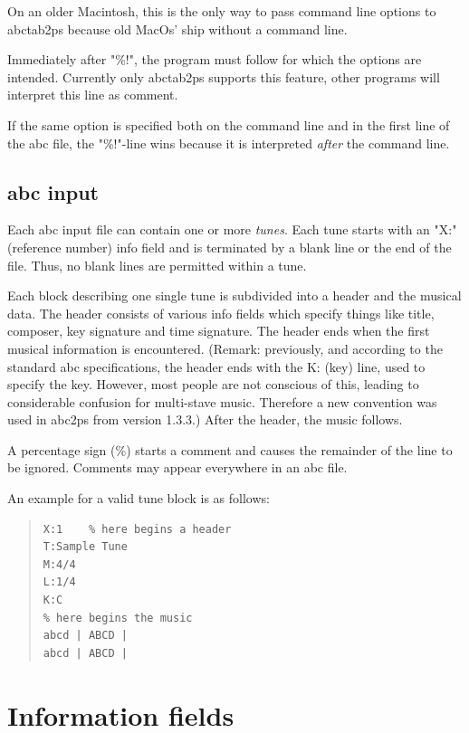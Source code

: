 \documentclass[a4paper]{article}
\begin{document}
On an older Macintosh, this is the only way to pass command line options
to abctab2ps because old MacOs' ship without a command line.
\par
Immediately after "\%!", the program must follow for which the 
options are intended. Currently only abctab2ps supports this
feature, other programs will interpret this line as comment.
\par
If the same option is specified both on the command line and
in the first line of the abc file, the "\%!"-line wins because
it is interpreted {\it after} the command line.

\subsection{abc input}
Each abc input file can contain one or more {\it tunes}. Each tune
starts with an "X:" (reference number) info field and is terminated by a 
blank line or the end of the file. Thus, no blank lines are permitted 
within a tune.
\par
Each block describing one single tune is subdivided into a header and the
musical data. The header consists of various info fields which specify
things like title, composer, key signature and time signature.
The header ends when the first musical information is encountered.
(Remark: previously, and according to the standard abc specifications, the
header ends with the K: (key) line, used to specify the key. However, most
people are not conscious of this, leading to considerable confusion
for multi-stave music. Therefore a new convention was used in abc2ps from
version 1.3.3.)
After the header, the music follows.
\par
{}
A percentage sign (\%) starts a comment and causes the 
remainder of the line to be ignored. Comments may appear everywhere in 
an abc file.
\par
An example for a valid tune block is as follows:

\begin{quote}
\begin{verbatim}
X:1    % here begins a header
T:Sample Tune
M:4/4
L:1/4
K:C
% here begins the music
abcd | ABCD |
abcd | ABCD |
\end{verbatim}
\end{quote}

\section{Information fields}
\end{document}
